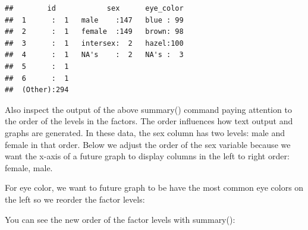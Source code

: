 \documentclass[
]{krantz}
\makeatletter
\newenvironment{Shaded}{\begin{snugshade}}{\end{snugshade}}
\newcommand{\DataTypeTok}[1]{\textcolor[rgb]{0.27,0.27,0.27}{#1}}
\newcommand{\KeywordTok}[1]{\textcolor[rgb]{0.27,0.27,0.27}{\textbf{#1}}}
\newcommand{\NormalTok}[1]{#1}
\newcommand{\OperatorTok}[1]{\textcolor[rgb]{0.43,0.43,0.43}{\textbf{#1}}}
\newcommand{\StringTok}[1]{\textcolor[rgb]{0.5,0.5,0.5}{#1}}
\newenvironment{kframe}{%
\medskip{}
\setlength{\fboxsep}{.8em}
 \def\at@end@of@kframe{}%
 \ifinner\ifhmode%
  \def\at@end@of@kframe{\end{minipage}}%
  \begin{minipage}{\columnwidth}%
 \fi\fi%
 \def\FrameCommand##1{\hskip\@totalleftmargin \hskip-\fboxsep
 \colorbox{shadecolor}{##1}\hskip-\fboxsep
     \hskip-\linewidth \hskip-\@totalleftmargin \hskip\columnwidth}%
 \MakeFramed {\advance\hsize-\width
   \@totalleftmargin\z@ \linewidth\hsize
   \@setminipage}}%
 {\par\unskip\endMakeFramed%
 \at@end@of@kframe}
\renewenvironment{Shaded}{\begin{kframe}}{\end{kframe}}
\makeatother
\begin{document}
\begin{verbatim}
##        id            sex      eye_color  
##  1      :  1   male    :147   blue : 99  
##  2      :  1   female  :149   brown: 98  
##  3      :  1   intersex:  2   hazel:100  
##  4      :  1   NA's    :  2   NA's :  3  
##  5      :  1                             
##  6      :  1                             
##  (Other):294
\end{verbatim}

Also inspect the output of the above summary() command paying attention to the order of the levels in the factors. The order influences how text output and graphs are generated. In these data, the sex column has two levels: male and female in that order. Below we adjust the order of the sex variable because we want the x-axis of a future graph to display columns in the left to right order: female, male.

\begin{Shaded}
\end{Shaded}

For eye color, we want to future graph to be have the most common eye colors on the left so we reorder the factor levels:

\begin{Shaded}
\end{Shaded}

You can see the new order of the factor levels with summary():

\begin{Shaded}
\end{Shaded}
\end{document}
